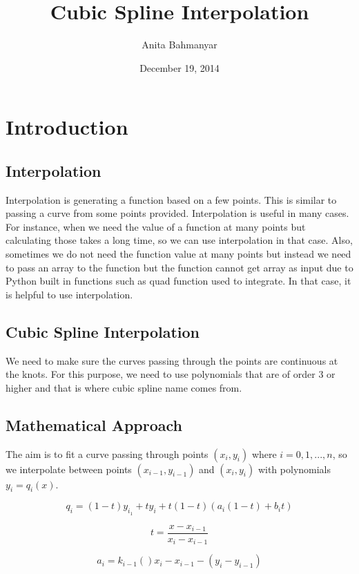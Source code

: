 \documentclass[letterpaper,12pt]{article}
\title{Cubic Spline Interpolation}
\author{Anita Bahmanyar}
\affil{\small {Student Number: 998909098}}
\affil{\small {anita.bahmanyar@mail.utoronto.ca}}
\date{December 19, 2014}
\begin{document}
\maketitle

\section{Introduction}
\subsection{Interpolation}
Interpolation is generating a function based on a few points. This is similar to passing a curve from some points provided. Interpolation is useful in many cases. For instance, when we need the value of a function at many points but calculating those takes a long time, so we can use interpolation in that case. Also, sometimes  we do not need the function value at many points but instead we need to pass an array to the function but the function cannot get array as input due to Python built in functions such as quad function used to integrate. In that case, it is helpful to use interpolation.

\subsection{Cubic Spline Interpolation}
We need to make sure the curves passing through the points are continuous at the knots. For this purpose, we need to use polynomials that are of order 3 or higher and that is where cubic spline name comes from.

\subsection{Mathematical Approach}
The aim is to fit a curve passing through points $(x_i,y_i)$ where $i=0,1,...,n$, so we interpolate between points $(x_{i-1},y_{i-1})$ and $(x_i,y_i)$ with polynomials $y_i = q_i(x)$.

\begin{equation}
q_i = (1-t)y_{i_1} + ty_i + t(1-t) (a_i (1-t) +b_it)
\end{equation}

\begin{equation}
t = \frac{x-x_{i-1}}{x_i - x_{i-1}}
\end{equation}

\begin{equation}
a_i = k_{i-1} ()x_i-x_{i-1} - (y_i - y_{i-1})
\end{equation}
\end{document}
